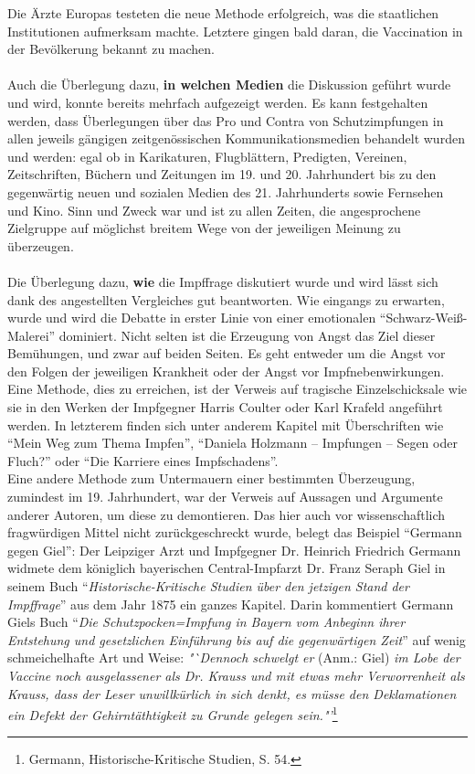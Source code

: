 \documentclass[
    a4paper,
    12pt,
    hyphens,
    chapterprefix=true,
    headheight=33pt,
    footheight=29pt,
    headings=optiontohead, %
]{scrartcl}
\begin{document}
{Die Ärzte Europas testeten die neue Methode erfolgreich, was die staatlichen Institutionen aufmerksam machte.
Letztere gingen bald daran, die Vaccination in der Bevölkerung bekannt zu machen. \\
\\
Auch die Überlegung dazu, \textbf{in welchen Medien} die Diskussion geführt wurde und wird, konnte bereits mehrfach aufgezeigt werden. Es kann festgehalten werden, dass Überlegungen über das Pro und Contra von Schutzimpfungen in allen jeweils gängigen zeitgenössischen Kommunikationsmedien behandelt wurden und werden: egal ob in Karikaturen, Flugblättern, Predigten, Vereinen, Zeitschriften, Büchern und Zeitungen im 19. und 20. Jahrhundert bis zu den gegenwärtig neuen und sozialen Medien des 21. Jahrhunderts sowie Fernsehen und Kino. Sinn und Zweck war und ist zu allen Zeiten, die angesprochene Zielgruppe auf möglichst breitem Wege von der jeweiligen Meinung zu überzeugen.\\
\\
Die Überlegung dazu, \textbf{wie} die Impffrage diskutiert wurde und wird lässt sich dank des angestellten Vergleiches gut beantworten. Wie eingangs zu erwarten, wurde und wird die Debatte in erster Linie von einer emotionalen "`Schwarz-Weiß-Malerei"' dominiert. Nicht selten ist die Erzeugung von Angst das Ziel dieser Bemühungen, und zwar auf beiden Seiten. Es geht entweder um die Angst vor den Folgen der jeweiligen Krankheit oder der Angst vor Impfnebenwirkungen. Eine Methode, dies zu erreichen, ist der Verweis auf tragische Einzelschicksale wie sie in den Werken der Impfgegner Harris Coulter oder Karl Krafeld angeführt werden. In letzterem finden sich unter anderem Kapitel mit Überschriften wie "`Mein Weg zum Thema Impfen"', "`Daniela Holzmann -- Impfungen -- Segen oder Fluch?"' oder "`Die Karriere eines Impfschadens"'. \\
Eine andere Methode zum Untermauern einer bestimmten Überzeugung, zumindest im 19. Jahrhundert, war der Verweis auf Aussagen und Argumente anderer Autoren, um diese zu demontieren. Das hier auch vor wissenschaftlich fragwürdigen Mittel nicht zurückgeschreckt wurde, belegt das Beispiel "`Germann gegen Giel"': Der Leipziger Arzt und Impfgegner Dr. Heinrich Friedrich Germann widmete dem königlich bayerischen Central-Impfarzt Dr. Franz Seraph Giel in seinem Buch "`\textit{Historische-Kritische Studien über den jetzigen Stand der Impffrage}"' aus dem Jahr 1875 ein ganzes Kapitel. Darin kommentiert Germann Giels Buch "`\textit{Die Schutzpocken=Impfung in Bayern vom Anbeginn ihrer Entstehung und gesetzlichen Einführung bis auf die gegenwärtigen Zeit}"' auf wenig schmeichelhafte Art und Weise: \textit{"`Dennoch schwelgt er} (Anm.: Giel) \textit{im Lobe der Vaccine noch ausgelassener als Dr. Krauss und mit etwas mehr Verworrenheit als Krauss, dass der Leser unwillkürlich in sich denkt, es müsse den Deklamationen ein Defekt der Gehirntäthtigkeit zu Grunde gelegen sein."'}\footnote{Germann, Historische-Kritische Studien, S. 54.}\\
}
\end{document}

